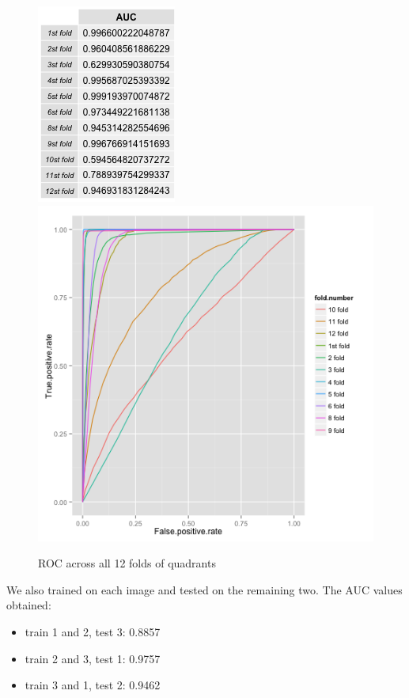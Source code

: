 \documentclass{article}\usepackage[]{graphicx}\usepackage[]{color}
\begin{document}
\begin{figure}[H]
  \includegraphics[width=\linewidth, height = 150pts]{AUC_12_folds.png}
\endminipage\hfill
{}
  \includegraphics[width=\linewidth, height = 150pts]{ROC_fold_comparison.png}
\endminipage
  \caption{ROC across all 12 folds of quadrants}\label{}
\end{figure}

We also trained on each image and tested on the remaining two. The AUC values obtained:

\begin{itemize}
\item train 1 and 2, test 3: 0.8857
\item train 2 and 3, test 1: 0.9757
\item train 3 and 1, test 2: 0.9462
\end{itemize}
\end{document}
